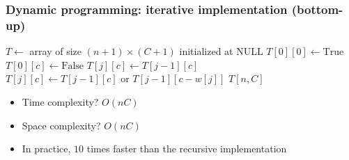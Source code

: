\documentclass{beamer}
\begin{document}
\begin{frame}
  \frametitle{Dynamic programming: iterative implementation (bottom-up)}

  \begin{algorithmic}
    \State$T \gets$ array of size $(n + 1) \times (C + 1)$ initialized at NULL
    \State$T[0][0] \gets \text{True}$
    \State$T[0][c] \gets \text{False}$
    \EndFor
    \State$T[j][c] \gets T[j - 1][c]$
    \EndFor
    \State$T[j][c] \gets T[j - 1][c] \text{ or } T[j - 1][c - w[j]]$
    \EndFor
    \EndFor
    \State\Return{}$T[n, C]$
    \EndProcedure{}
  \end{algorithmic}

  \begin{itemize}
    \item \pause Time complexity? \pause $O(nC)$
    \item \pause Space complexity? \pause $O(nC)$
    \item \pause In practice, $10$ times faster than the recursive implementation
  \end{itemize}

\end{frame}
\end{document}
